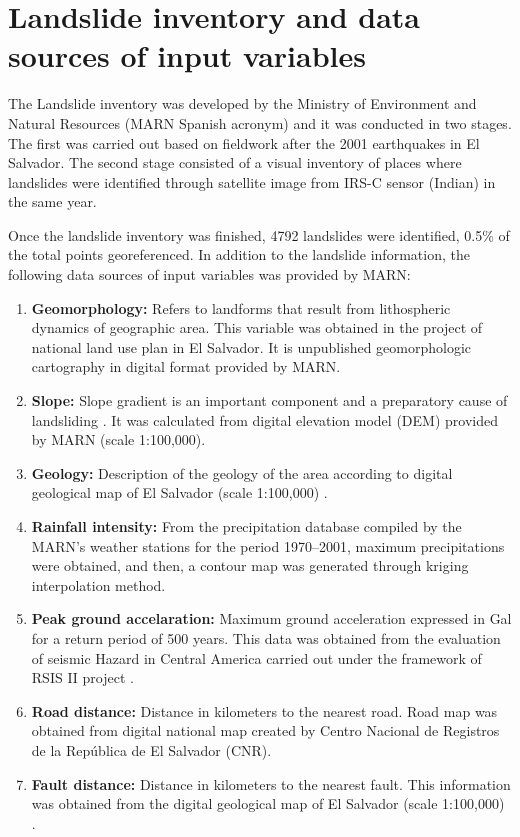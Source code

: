 \documentclass[11pt,twoside]{rmta2010eng}%
\begin{document}
\section{Landslide inventory and data sources of input variables}
\label{sec:landsinvet}
The Landslide inventory was developed by the Ministry of Environment and Natural Resources (MARN Spanish acronym) and it was conducted in two stages. The first was carried out based on fieldwork after the 2001 earthquakes in El Salvador. The second stage consisted of a visual inventory of places where landslides were identified through satellite image from IRS-C sensor (Indian) in the same year.


Once the landslide inventory was finished, 4792 landslides were identified, 0.5\% of the total points georeferenced. In addition to the landslide information, the following data sources of input variables was provided by MARN: 


\begin{enumerate}
\item {\bf Geomorphology:} Refers to landforms that result from lithospheric dynamics of geographic area. This variable was obtained in the project of national land use plan in El Salvador. It is unpublished geomorphologic cartography in digital format provided by MARN.


\item {\bf Slope:} Slope gradient is an important component and a
preparatory cause of landsliding \cite{garcia2008}. It was calculated from digital elevation model (DEM) provided by MARN (scale 1:100,000). 

\item {\bf Geology:} Description of the geology of the area according to digital geological map of  El Salvador (scale 1:100,000) \cite{weber}.

\item {\bf Rainfall intensity:} From the precipitation database compiled by the
MARN's weather stations for the period 1970–2001, maximum precipitations were obtained, 
and then, a contour map was generated through kriging interpolation method.

\item {\bf Peak ground accelaration:} Maximum ground acceleration expressed in Gal for a return period of 500 years. This data was obtained from the evaluation of seismic Hazard in Central America carried out under the framework of RSIS II project \cite{beni2012}.

\item {\bf Road distance:} Distance in kilometers to the nearest road. Road map was obtained from digital national map created by Centro Nacional de Registros de la Rep\'{u}blica de El Salvador (CNR).

\item {\bf Fault distance:} Distance in kilometers to the nearest fault. This information was obtained from the digital geological map of El Salvador (scale 1:100,000) \cite{weber}.
 
\end{enumerate}
\end{document}
